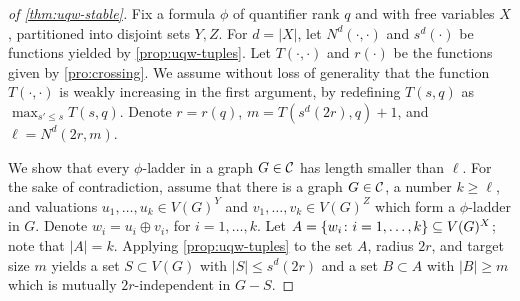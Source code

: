 \begin{proof}[of \cref{thm:uqw-stable}]
Fix a formula $\phi$ of quantifier rank $q$ and with free variables $X$, partitioned into disjoint sets $Y,Z$.
For $d=|X|$,
let $N^d(\cdot,\cdot)$ and $s^d(\cdot)$ be functions yielded by \cref{prop:uqw-tuples}.
Let $T(\cdot,\cdot)$ and $r(\cdot)$ be the functions given by \cref{pro:crossing}.
We assume without loss of generality that the function $T(\cdot,\cdot)$ is weakly increasing in the first argument, by redefining $T(s,q)$ as $\max_{s'\le s} T(s,q)$.
Denote $r=r(q)$, $m=T(s^d(2r),q)+1$, and $\ell=N^d(2r,m)$.

We show that 
every $\phi$-ladder in a graph $G\in\cal C$ has length smaller than $\ell$. 
For the sake of contradiction, assume that there is a graph $G\in\cal C$, a number $k\ge \ell$,
and valuations $u_1,\ldots,u_k\in V(G)^Y$ and $ v_1,\ldots, v_k\in V(G)^Z$
which form a $\phi$-ladder in $G$.
Denote $w_i=u_i\oplus v_i$, for $i=1,\ldots,k$.
	Let $A=\set{ w_i\colon i=1,\ldots,k}\subset V(G)^X$; note that $|A|=k$.
Applying \cref{prop:uqw-tuples} to the set $A$, radius $2r$, and target size $m$
		 yields a set $S\subset V(G)$ with $|S|\le s^d(2r)$
	and a set $B\subset A$ with $|B|\geq m$ which is mutually $2r$-independent in $G-S$.
%
%
%

\end{proof}
